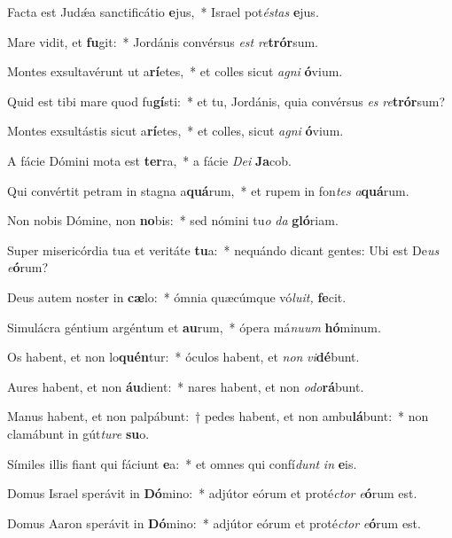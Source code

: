 \item Facta est Judǽa sanctificátio \textbf{e}jus,~* Israel pot\textit{éstas} \textbf{e}jus.
\item Mare vidit, et \textbf{fu}git:~* Jordánis convérsus \textit{est} \textit{re}\textbf{trór}sum.
\item Montes exsultavérunt ut a\textbf{rí}etes,~* et colles sicut \textit{agni} \textbf{ó}vium.
\item Quid est tibi mare quod fu\textbf{gí}sti:~* et tu, Jordánis, quia convérsus \textit{es} \textit{re}\textbf{trór}sum?
\item Montes exsultástis sicut a\textbf{rí}etes,~* et colles, sicut \textit{agni} \textbf{ó}vium.
\item A fácie Dómini mota est \textbf{ter}ra,~* a fácie \textit{Dei} \textbf{Ja}cob.
\item Qui convértit petram in stagna a\textbf{quá}rum,~* et rupem in fon\textit{tes} \textit{a}\textbf{quá}rum.
\item Non nobis Dómine, non \textbf{no}bis:~* sed nómini tu\textit{o} \textit{da} \textbf{gló}riam.
\item Super misericórdia tua et veritáte \textbf{tu}a:~* nequándo dicant gentes: Ubi est De\hspace{0.02em}\textit{us} \textit{e}\textbf{ó}rum?
\item Deus autem noster in \textbf{cæ}lo:~* ómnia quæcúmque vó\textit{luit,} \textbf{fe}cit.
\item Simulácra géntium argéntum et \textbf{au}rum,~* ópera má\textit{nuum} \textbf{hó}minum.
\item Os habent, et non lo\textbf{quén}tur:~* óculos habent, et \textit{non} \textit{vi}\textbf{dé}bunt.
\item Aures habent, et non \textbf{áu}dient:~* nares habent, et non \textit{odo}\textbf{rá}bunt.
\item Manus habent, et non palpábunt:~† pedes habent, et non ambu\textbf{lá}bunt:~* non clamábunt in gút\textit{ture} \textbf{su}o.
\item Símiles illis fiant qui fáciunt \textbf{e}a:~* et omnes qui confí\hspace{0.02em}\textit{dunt} \textit{in} \textbf{e}is.
\item Domus Israel sperávit in \textbf{Dó}mino:~* adjútor eórum et proté\teenyhspace\textit{ctor} \textit{e}\textbf{ó}rum est.
\item Domus Aaron sperávit in \textbf{Dó}mino:~* adjútor eórum et proté\teenyhspace\textit{ctor} \textit{e}\textbf{ó}rum est.
